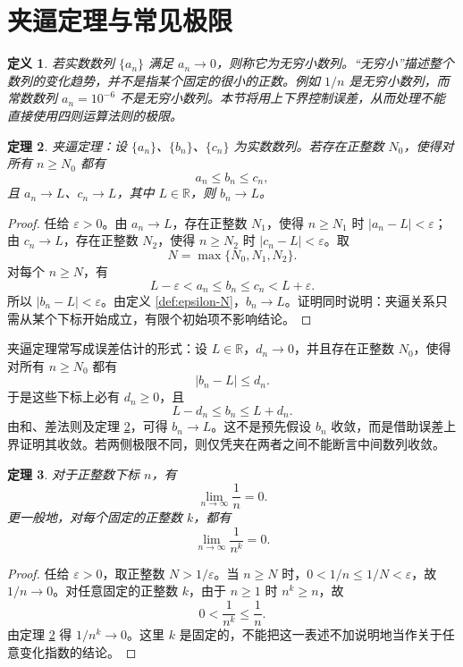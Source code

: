 \documentclass[UTF8,fontset=fandol,11pt]{ctexart}
\newtheorem{definition}{定义}[section]
\newtheorem{theorem}[definition]{定理}
\begin{document}
\section{夹逼定理与常见极限}\label{sec:S03}
\begin{definition}
若实数数列 $\{a_n\}$ 满足 $a_n\to0$，则称它为无穷小数列。“无穷小”描述整个数列的变化趋势，并不是指某个固定的很小的正数。例如 $1/n$ 是无穷小数列，而常数数列 $a_n=10^{-6}$ 不是无穷小数列。本节将用上下界控制误差，从而处理不能直接使用四则运算法则的极限。
\end{definition}
\begin{theorem}
\label{thm:squeeze-sequence}夹逼定理：设 $\{a_n\}$、$\{b_n\}$、$\{c_n\}$ 为实数数列。若存在正整数 $N_0$，使得对所有 $n\geq N_0$ 都有
\[
a_n\leq b_n\leq c_n,
\]
且 $a_n\to L$、$c_n\to L$，其中 $L\in\mathbb{R}$，则 $b_n\to L$。
\end{theorem}
\begin{proof}
任给 $\varepsilon>0$。由 $a_n\to L$，存在正整数 $N_1$，使得 $n\geq N_1$ 时 $|a_n-L|<\varepsilon$；由 $c_n\to L$，存在正整数 $N_2$，使得 $n\geq N_2$ 时 $|c_n-L|<\varepsilon$。取
\[
N=\max\{N_0,N_1,N_2\}.
\]
对每个 $n\geq N$，有
\[
L-\varepsilon<a_n\leq b_n\leq c_n<L+\varepsilon.
\]
所以 $|b_n-L|<\varepsilon$。由定义 \ref{def:epsilon-N}，$b_n\to L$。证明同时说明：夹逼关系只需从某个下标开始成立，有限个初始项不影响结论。
\end{proof}
夹逼定理常写成误差估计的形式：设 $L\in\mathbb{R}$，$d_n\to0$，并且存在正整数 $N_0$，使得对所有 $n\geq N_0$ 都有
\[
|b_n-L|\leq d_n.
\]
于是这些下标上必有 $d_n\geq0$，且
\[
L-d_n\leq b_n\leq L+d_n.
\]
由和、差法则及定理 \ref{thm:squeeze-sequence}，可得 $b_n\to L$。这不是预先假设 $b_n$ 收敛，而是借助误差上界证明其收敛。若两侧极限不同，则仅凭夹在两者之间不能断言中间数列收敛。\par
\begin{theorem}
\label{thm:basic-reciprocal-limit}对于正整数下标 $n$，有
\[
\lim_{n\to\infty}\frac1n=0.
\]
更一般地，对每个固定的正整数 $k$，都有
\[
\lim_{n\to\infty}\frac1{n^k}=0.
\]
\end{theorem}
\begin{proof}
任给 $\varepsilon>0$，取正整数 $N>1/\varepsilon$。当 $n\geq N$ 时，$0<1/n\leq1/N<\varepsilon$，故 $1/n\to0$。对任意固定的正整数 $k$，由于 $n\geq1$ 时 $n^k\geq n$，故
\[
0<\frac1{n^k}\leq\frac1n.
\]
由定理 \ref{thm:squeeze-sequence} 得 $1/n^k\to0$。这里 $k$ 是固定的，不能把这一表述不加说明地当作关于任意变化指数的结论。
\end{proof}
\end{document}
